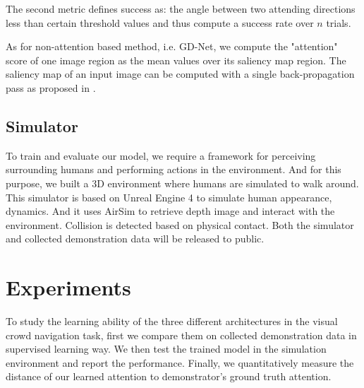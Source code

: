 \documentclass[10pt,twocolumn,letterpaper]{article}
\begin{document}
The second metric defines success as: the angle between two attending directions less than certain threshold values and thus compute a success rate over $n$ trials.

As for non-attention based method, i.e. GD-Net, we compute the "attention" score of one image region as the mean values over its saliency map region. The saliency map of an input image can be computed with a single back-propagation pass as proposed in \cite{simonyan_deep_2013}.


\subsection{Simulator}
To train and evaluate our model, we require a framework for perceiving surrounding humans and performing actions in the environment. And for this purpose, we built a 3D environment where humans are simulated to walk around. This simulator is based on Unreal Engine 4 to simulate human appearance, dynamics. And it uses AirSim \cite{airsim2017fsr} to retrieve depth image and interact with the environment. Collision is detected based on physical contact. Both the simulator and collected demonstration data will be released to public.




\section{Experiments}
To study the learning ability of the three different architectures in the visual crowd navigation task, first we compare them on collected demonstration data in supervised learning way. We then test the trained model in the simulation environment and report the performance. Finally, we quantitatively measure the distance of our learned attention to demonstrator's ground truth attention. 
\end{document}
